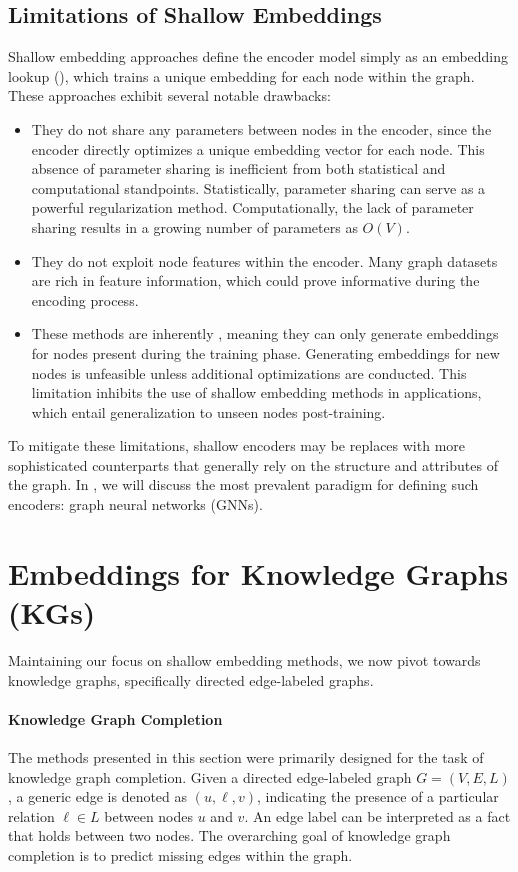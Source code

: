 \subsection{Limitations of Shallow Embeddings}
Shallow embedding approaches define the encoder model simply as an embedding lookup (), which trains a unique embedding for each node within the graph. These approaches exhibit several notable drawbacks:
\begin{itemize}
    \item They do not share any parameters between nodes in the encoder, since the encoder directly optimizes a unique embedding vector for each node. This absence of parameter sharing is inefficient from both statistical and computational standpoints. Statistically, parameter sharing can serve as a powerful regularization method. Computationally, the lack of parameter sharing results in a growing number of parameters as $ O(V) $.
    \item They do not exploit node features within the encoder. Many graph datasets are rich in feature information, which could prove informative during the encoding process.
    \item These methods are inherently , meaning they can only generate embeddings for nodes present during the training phase. Generating embeddings for new nodes is unfeasible unless additional optimizations are conducted. This limitation inhibits the use of shallow embedding methods in  applications, which entail generalization to unseen nodes post-training.
\end{itemize}
To mitigate these limitations, shallow encoders may be replaces with more sophisticated counterparts that generally rely on the structure and attributes of the graph. In , we will discuss the most prevalent paradigm for defining such encoders: graph neural networks (GNNs).

\section{Embeddings for Knowledge Graphs (KGs)}\label{sec:embeddingsKGs}
Maintaining our focus on shallow embedding methods, we now pivot towards knowledge graphs, specifically directed edge-labeled graphs.

\paragraph{Knowledge Graph Completion}
The methods presented in this section were primarily designed for the task of knowledge graph completion. Given a directed edge-labeled graph $ G = (V, E, L) $, a generic edge is denoted as $ (u,\ell,v) $, indicating the presence of a particular relation $ \ell \in L $ between nodes $ u $ and $ v $. An edge label can be interpreted as a fact that holds between two nodes. The overarching goal of knowledge graph completion is to predict missing edges within the graph.

